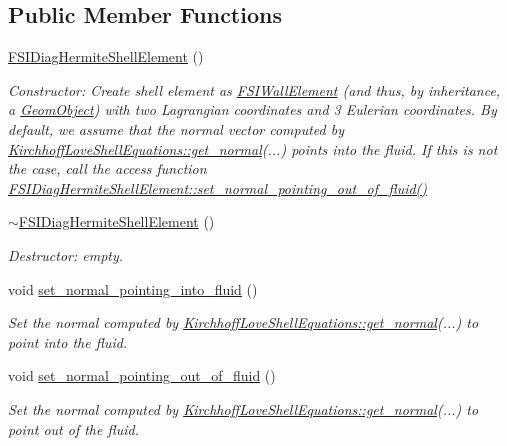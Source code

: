 \subsection*{Public Member Functions}
\begin{DoxyCompactItemize}
\item 
\hyperlink{classoomph_1_1FSIDiagHermiteShellElement_a78392f4bffecd3fc7d03c6b6e9352735}{F\+S\+I\+Diag\+Hermite\+Shell\+Element} ()
\begin{DoxyCompactList}\small\item\em Constructor\+: Create shell element as \hyperlink{classoomph_1_1FSIWallElement}{F\+S\+I\+Wall\+Element} (and thus, by inheritance, a \hyperlink{classoomph_1_1GeomObject}{Geom\+Object}) with two Lagrangian coordinates and 3 Eulerian coordinates. By default, we assume that the normal vector computed by \hyperlink{classoomph_1_1KirchhoffLoveShellEquations_a797e455634ac8b8e8669c4adff84e644}{Kirchhoff\+Love\+Shell\+Equations\+::get\+\_\+normal}(...) points into the fluid. If this is not the case, call the access function \hyperlink{classoomph_1_1FSIDiagHermiteShellElement_a4c2485cc6e268e9201f914166852ca90}{F\+S\+I\+Diag\+Hermite\+Shell\+Element\+::set\+\_\+normal\+\_\+pointing\+\_\+out\+\_\+of\+\_\+fluid()} \end{DoxyCompactList}\item 
\hyperlink{classoomph_1_1FSIDiagHermiteShellElement_a7ae23be78dc5ef53c3b88d3f78229e40}{$\sim$\+F\+S\+I\+Diag\+Hermite\+Shell\+Element} ()
\begin{DoxyCompactList}\small\item\em Destructor\+: empty. \end{DoxyCompactList}\item 
void \hyperlink{classoomph_1_1FSIDiagHermiteShellElement_abed851f68c2b68aaa884c66592371966}{set\+\_\+normal\+\_\+pointing\+\_\+into\+\_\+fluid} ()
\begin{DoxyCompactList}\small\item\em Set the normal computed by \hyperlink{classoomph_1_1KirchhoffLoveShellEquations_a797e455634ac8b8e8669c4adff84e644}{Kirchhoff\+Love\+Shell\+Equations\+::get\+\_\+normal}(...) to point into the fluid. \end{DoxyCompactList}\item 
void \hyperlink{classoomph_1_1FSIDiagHermiteShellElement_a4c2485cc6e268e9201f914166852ca90}{set\+\_\+normal\+\_\+pointing\+\_\+out\+\_\+of\+\_\+fluid} ()
\begin{DoxyCompactList}\small\item\em Set the normal computed by \hyperlink{classoomph_1_1KirchhoffLoveShellEquations_a797e455634ac8b8e8669c4adff84e644}{Kirchhoff\+Love\+Shell\+Equations\+::get\+\_\+normal}(...) to point out of the fluid. \end{DoxyCompactList}\item 

\end{DoxyCompactItemize}
